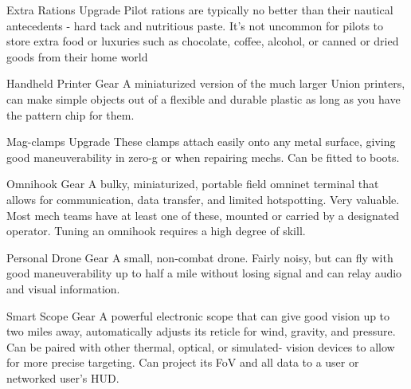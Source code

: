 Extra Rations                 Upgrade        Pilot rations are typically no better than their nautical antecedents
                                             - hard tack and nutritious paste. It's not uncommon for pilots to
                                             store extra food or luxuries such as chocolate, coffee, alcohol, or
                                             canned or dried goods from their home world

Handheld Printer              Gear           A miniaturized version of the much larger Union printers, can
                                             make simple objects out of a flexible and durable plastic as long
                                             as you have the pattern chip for them.

Mag-clamps                    Upgrade        These clamps attach easily onto any metal surface, giving good
                                             maneuverability in zero-g or when repairing mechs. Can be fitted
                                             to boots.




Omnihook                      Gear           A bulky, miniaturized, portable field omninet terminal that allows
                                             for communication, data transfer, and limited hotspotting. Very
                                             valuable. Most mech teams have at least one of these, mounted
                                             or carried by a designated operator. Tuning an omnihook requires
                                             a high degree of skill.

Personal Drone                Gear           A small, non-combat drone. Fairly noisy, but can fly with good
                                             maneuverability up to half a mile without losing signal and can
                                             relay audio and visual information.

Smart Scope                   Gear           A powerful electronic scope that can give good vision up to two
                                             miles away, automatically adjusts its reticle for wind, gravity, and
                                             pressure. Can be paired with other thermal, optical, or simulated-
                                             vision devices to allow for more precise targeting. Can project its
                                             FoV and all data to a user or networked user's HUD.

